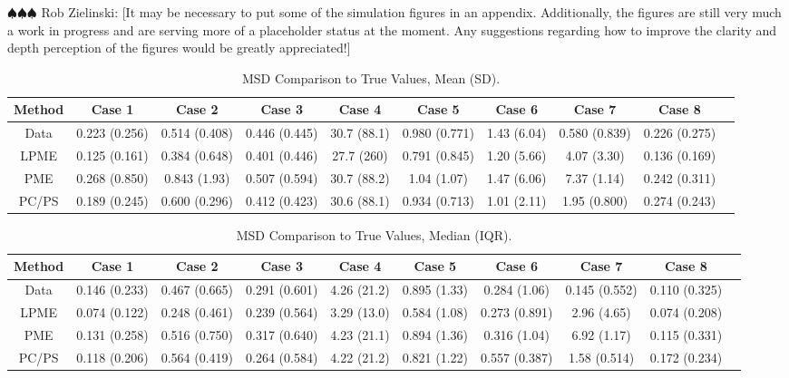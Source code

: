 \documentclass[11pt,reqno]{article}
\newcommand{\zielinski}[1]{{\color{blue} \sf $\spadesuit\spadesuit\spadesuit$ Rob Zielinski: [#1]}}
\theoremstyle{definition}
\begin{document}
\zielinski{It may be necessary to put some of the simulation figures in an appendix. Additionally, the figures are still very much a work in progress and are serving more of a placeholder status at the moment. Any suggestions regarding how to improve the clarity and depth perception of the figures would be greatly appreciated!}

\begin{table}[h]
\footnotesize
  \centering
  \begin{tabular}{|c c c c c c c c c c|}
    \hline
    Method & Case 1 & Case 2 & Case 3 & Case 4 & Case 5 & Case 6 & Case 7 & Case 8 \\
    \hline
    Data & 0.223 (0.256) & 0.514 (0.408) & 0.446 (0.445) & 30.7 (88.1) & 0.980 (0.771) & 1.43 (6.04) & 0.580 (0.839) & 0.226 (0.275) \\
    LPME & 0.125 (0.161) & 0.384 (0.648) & 0.401 (0.446) & 27.7 (260) & 0.791 (0.845) & 1.20 (5.66) & 4.07 (3.30) & 0.136 (0.169) \\
    PME & 0.268 (0.850) & 0.843 (1.93) & 0.507 (0.594) & 30.7 (88.2) & 1.04 (1.07) & 1.47 (6.06) & 7.37 (1.14) & 0.242 (0.311) \\
    PC/PS & 0.189 (0.245) & 0.600 (0.296) & 0.412 (0.423) & 30.6 (88.1) & 0.934 (0.713) & 1.01 (2.11) & 1.95 (0.800) & 0.274 (0.243) \\
    \hline
  \end{tabular}
  \caption{MSD Comparison to True Values, Mean (SD).}
  \label{table:simulation_results_mean}
\end{table}

\begin{table}[h]
\footnotesize
  \centering
  \begin{tabular}{|c c c c c c c c c c|}
    \hline
    Method & Case 1 & Case 2 & Case 3 & Case 4 & Case 5 & Case 6 & Case 7 & Case 8 \\
    \hline
    Data & 0.146 (0.233) & 0.467 (0.665) & 0.291 (0.601) & 4.26 (21.2) & 0.895 (1.33) & 0.284 (1.06) & 0.145 (0.552) & 0.110 (0.325) \\
    LPME & 0.074 (0.122) & 0.248 (0.461) & 0.239 (0.564) & 3.29 (13.0) & 0.584 (1.08) & 0.273 (0.891) & 2.96 (4.65) & 0.074 (0.208) \\
    PME & 0.131 (0.258) & 0.516 (0.750) & 0.317 (0.640) & 4.23 (21.1) & 0.894 (1.36) & 0.316 (1.04) & 6.92 (1.17) & 0.115 (0.331) \\
    PC/PS & 0.118 (0.206) & 0.564 (0.419) & 0.264 (0.584) & 4.22 (21.2) & 0.821 (1.22) & 0.557 (0.387) & 1.58 (0.514) & 0.172 (0.234) \\
    \hline
  \end{tabular}
  \caption{MSD Comparison to True Values, Median (IQR).}
  \label{table:simulation_results_median}
\end{table}
\end{document}
